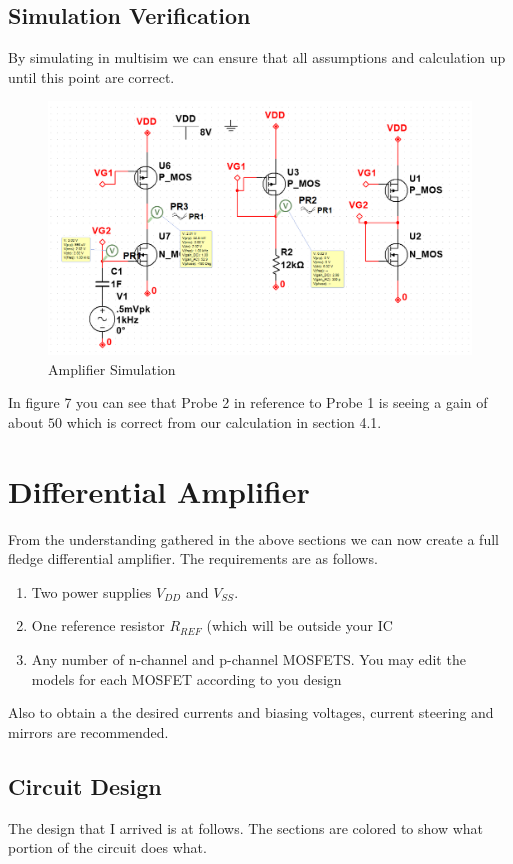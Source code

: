\documentclass[12pt]{article}
\begin{document}
\subsection{Simulation Verification}
By simulating in multisim we can ensure that all assumptions and calculation up until this point are correct.
\begin{figure}[h]
	\label{fig:amp}
	\caption{Amplifier Simulation}
	\centering
	\includegraphics[width=1\textwidth]{simulation2}
\end{figure}
In figure 7 you can see that Probe 2 in reference to Probe 1 is seeing a gain of about $50$ which is correct from our calculation in section 4.1.

\section{Differential Amplifier}
From the understanding gathered in the above sections we can now create a full fledge differential amplifier. The requirements are as follows.

\begin{enumerate}
	\item Two power supplies $V_{DD}$ and $V_{SS}$.	
	\item One reference resistor $R_{REF}$ (which will be outside your IC
	\item Any number of n-channel and p-channel MOSFETS. You may edit the models for each
	MOSFET according to you design
\end{enumerate}

Also to obtain a the desired currents and biasing voltages, current steering and mirrors are recommended.


\subsection{Circuit Design}
The design that I arrived is at follows. The sections are colored to show what portion of the circuit does what.
\end{document}
